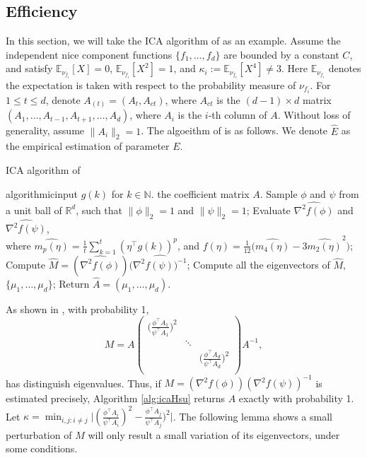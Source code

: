 \documentclass[english]{article} %
\newcommand{\E}{\mathbb{E}}
\newcommand{\real}{\mathbb{R}}
\renewcommand{\natural}{\mathbb{N}}
\theoremstyle{plain}
\theoremstyle{remark}
\theoremstyle{claim}
\theoremstyle{plain}
\begin{document}
\subsection{Efficiency}
In this section, we will take the ICA algorithm of \citet{DHsu2012} as an example. 
Assume the independent nice component functions $\{f_1,\ldots,f_d\}$ are bounded by a constant $C$, and satisfy $\E_{\nu_{f_i}}[X]=0$, $\E_{\nu_{f_i}}[X^2]=1$, and $\kappa_i := \E_{\nu_{f_i}}[X^4]\neq 3$. 
Here $\E_{\nu_{f_i}}$ denotes the expectation is taken with respect to the probability measure of $\nu_{f_i}$. 
For $1\le t\le d$, denote $A_{(t)} = (A_t,A_{ct})$, where $A_{ct}$ is the $(d-1)\times d$ matrix $(A_1,\ldots,A_{t-1},A_{t+1},\ldots,A_d)$, where $A_i$ is the $i$-th column of $A$. 
Without loss of generality, assume $\|A_i\|_2=1$.
The algoeithm of \citet{DHsu2012} is as follows. We denote $\widehat{E}$ as the empirical estimation of parameter $E$. 
\begin{algorithm}[H]
\caption{ICA algorithm of \citet{DHsu2012} \label{alg:icaHsu}}
\begin{algorithmic}[1]
\INPUT algorithmicinput $g(k)$ for $k\in\natural$.
\OUTPUT the coefficient matrix $A$. 
\STATE Sample $\phi$ and $\psi$ from a unit ball of $\real^d$, such that $\|\phi\|_2 = 1$ and $\|\psi\|_2 = 1$;
\STATE Evaluate $\widehat{\nabla^2f(\phi)}$ and $\widehat{\nabla^2f(\psi)}$, \\
\quad where $\widehat{m_p(\eta)} = \frac{1}{t}\sum_{k=1}^{t} (\eta^{\top}g(k))^p$, and $f(\eta) = \frac{1}{12}\big(\widehat{m_4(\eta)} - 3\widehat{m_2(\eta)}^2 \big)$;
\STATE Compute $\widehat{M} = (\widehat{\nabla^2f(\phi)})(\widehat{\nabla^2f(\psi))^{-1}}$;
\STATE Compute all the eigenvectors of $\widehat{M}$, $\{\mu_1,\ldots,\mu_d\}$;
\STATE Return $\widehat{A} = (\mu_1,\ldots,\mu_d)$.
\end{algorithmic}
\end{algorithm}

As shown in \citep{DHsu2012}, with probability 1,
\begin{equation}
\label{eq:M}
M = A 
\left(
\begin{array}{ccc}
\big(\frac{\phi^{\top}A_1}{\psi^{\top}A_1}\big)^2 & &\\
    & \ddots & \\
    & & \big(\frac{\phi^{\top}A_d}{\psi^{\top}A_d}\big)^2\\
\end{array} 
\right) 
A^{-1},
\end{equation}
has distinguish eigenvalues. Thus, if $M =(\nabla^2f(\phi))(\nabla^2f(\psi))^{-1} $ is estimated precisely, Algorithm \ref{alg:icaHsu} returns $A$ exactly  with probability 1. 
Let $\kappa =  \min_{i,j: i\neq j} \vert (\frac{\phi^{\top}A_i}{\psi^{\top}A_i})^2 - \frac{\phi^{\top}A_j}{\psi^{\top}A_j})^2 \vert $. The following lemma shows a small perturbation of $M$ will only result a small variation of its eigenvectors, under some conditions.
\end{document}
